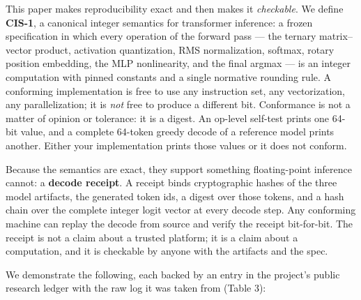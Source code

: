 \documentclass[11pt]{article}
\begin{document}
This paper makes reproducibility exact and then makes it \emph{checkable}. We define \textbf{CIS-1}, a
canonical integer semantics for transformer inference: a frozen specification in which every
operation of the forward pass --- the ternary matrix--vector product, activation quantization,
RMS normalization, softmax, rotary position embedding, the MLP nonlinearity, and the final argmax ---
is an integer computation with pinned constants and a single normative rounding rule. A
conforming implementation is free to use any instruction set, any vectorization, any
parallelization; it is \emph{not} free to produce a different bit. Conformance is not a matter of
opinion or tolerance: it is a digest. An op-level self-test prints one 64-bit value, and a
complete 64-token greedy decode of a reference model prints another. Either your implementation
prints those values or it does not conform.

Because the semantics are exact, they support something floating-point inference cannot: a
\textbf{decode receipt}. A receipt binds cryptographic hashes of the three model artifacts, the
generated token ids, a digest over those tokens, and a hash chain over the complete integer logit
vector at every decode step. Any conforming machine can replay the decode from source and
verify the receipt bit-for-bit. The receipt is not a claim about a trusted platform; it is a
claim about a computation, and it is checkable by anyone with the artifacts and the spec.

We demonstrate the following, each backed by an entry in the project's public research ledger
with the raw log it was taken from (Table 3):
\end{document}
